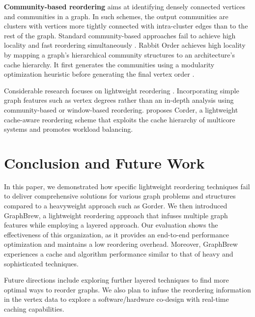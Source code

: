 \documentclass[sigconf, nonacm]{acmart}
\begin{document}
\textbf{Community-based reordering} \cite{broder_resemblance_1997, chierichetti_compressing_2009, lasalle_multi-threaded_2013, george_nested_1973} aims at identifying densely connected vertices and communities in a graph. In such schemes, the output communities are clusters with vertices more tightly connected with intra-cluster edges than to the rest of the graph. Standard community-based approaches fail to achieve high locality and fast reordering simultaneously \cite{arai_rabbit_2016}. Rabbit Order \cite{arai_rabbit_2016} achieves high locality by mapping a graph's hierarchical community structures to an architecture's cache hierarchy. It first generates the communities using a modularity optimization heuristic before generating the final vertex order \cite{barik_vertex_2020}.

Considerable research focuses on lightweight reordering \cite{balaji_when_2018,faldu_closer_2020,chen_workload_2021}. Incorporating simple graph features such as vertex degrees rather than an in-depth analysis using community-based or window-based reordering. \cite{chen_workload_2021} proposes Corder, a lightweight cache-aware reordering scheme that exploits the cache hierarchy of multicore systems and promotes workload balancing.

\section{Conclusion and Future Work}

In this paper, we demonstrated how specific lightweight reordering techniques fail to deliver comprehensive solutions for various graph problems and structures compared to a heavyweight approach such as Gorder. We then introduced GraphBrew, a lightweight reordering approach that infuses multiple graph features while employing a layered approach. Our evaluation shows the effectiveness of this organization, as it provides an end-to-end performance optimization and maintains a low reordering overhead. Moreover, GraphBrew experiences a cache and algorithm performance similar to that of heavy and sophisticated techniques.
 
Future directions include exploring further layered techniques to find more optimal ways to reorder graphs. We also plan to infuse the reordering information in the vertex data to explore a software/hardware co-design with real-time caching capabilities.





\end{document}
